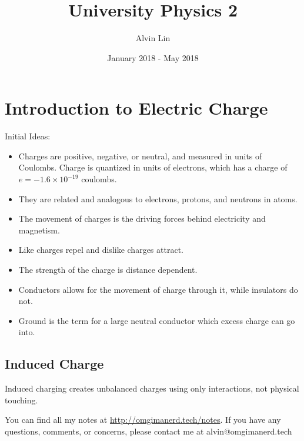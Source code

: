 \documentclass{math}
\title{University Physics 2}
\author{Alvin Lin}
\date{January 2018 - May 2018}
\begin{document}
\maketitle

\section*{Introduction to Electric Charge}
Initial Ideas:
\begin{itemize}
  \item Charges are positive, negative, or neutral, and measured in units of
  Coulombs. Charge is quantized in units of electrons, which has a charge of
  \( e = -1.6\times10^{-19} \) coulombs.
  \item They are related and analogous to electrons, protons, and neutrons in
  atoms.
  \item The movement of charges is the driving forces behind electricity and
  magnetism.
  \item Like charges repel and dislike charges attract.
  \item The strength of the charge is distance dependent.
  \item Conductors allows for the movement of charge through it, while
  insulators do not.
  \item Ground is the term for a large neutral conductor which excess charge
  can go into.
\end{itemize}

\subsection*{Induced Charge}
Induced charging creates unbalanced charges using only interactions, not
physical touching.
\begin{center}
\end{center}
\begin{center}
\end{center}


\begin{center}
  You can find all my notes at \url{http://omgimanerd.tech/notes}. If you have
  any questions, comments, or concerns, please contact me at
  alvin@omgimanerd.tech
\end{center}
\end{document}

